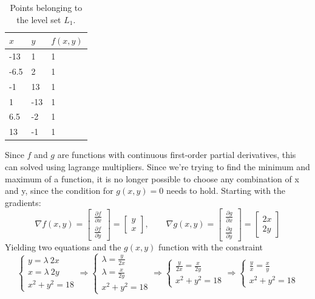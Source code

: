 \begin{table}[H]
    \centering
    \begin{tabularx}{\textwidth}{|X|X|X|}
        \hline
        $x$ & $y$ & $f(x,y)$ \\ \hline
        -13  & 1   & 1 \\ \hline
        -6.5 & 2   & 1 \\ \hline
        -1   & 13  & 1 \\ \hline
        1    & -13 & 1 \\ \hline
        6.5  & -2  & 1 \\ \hline
        13   & -1  & 1 \\ \hline
    \end{tabularx}
    \caption{Points belonging to the level set $L_1$.}
    \label{tab:levelset}
\end{table}
Since $f$ and $g$ are functions with continuous first-order partial derivatives, this can solved using lagrange multipliers.
Since we're trying to find the minimum and maximum of a function, it is no longer possible to choose any combination of x and y,
since the condition for $g(x,y) = 0$ needs to hold.
Starting with the gradients:
\[\nabla f(x,y) = 
\begin{bmatrix}
    \frac{\partial f}{\partial x}\\
    \frac{\partial f}{\partial y}
\end{bmatrix}
=
\begin{bmatrix}
    y\\x
\end{bmatrix}
,\qquad
\nabla g(x,y) =  
\begin{bmatrix}
    \frac{\partial g}{\partial x}\\
    \frac{\partial g}{\partial y}
\end{bmatrix}
=
\begin{bmatrix}
    2x\\2y
\end{bmatrix}\]
Yielding two equations and the $g(x,y)$ function with the constraint
\[
\begin{cases}
    y = \lambda \ 2x\\
    x = \lambda \ 2y\\
    x^2 + y^2 = 18
\end{cases}
\Rightarrow
\begin{cases}
    \lambda = \frac{y}{2x}\\
    \lambda = \frac{x}{2y}\\
    x^2+y^2=18
\end{cases}
\Rightarrow
\begin{cases}
    \frac{y}{2x} = \frac{x}{2y}\\
    x^2+y^2=18
\end{cases}
\Rightarrow
\begin{cases}
    \frac{y}{x} = \frac{x}{y}\\
    x^2+y^2=18
\end{cases}
\]
